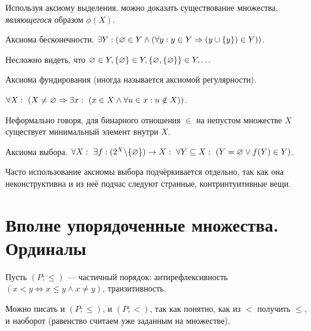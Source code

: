 \documentclass[a4paper]{report}
\begin{document}
{        Используя аксиому выделения, можно доказать существование множества, \textit{являющегося} образом $\phi(X)$.
        \item Аксиома бесконечности. $\exists Y : (\varnothing \in Y \land (\forall y : y \in Y \Rightarrow (y \cup \{y\}) \in Y))$.

        Несложно видеть, что $\varnothing \in Y, \{\varnothing\} \in Y, \{\varnothing, \{\varnothing\}\} \in Y, \dots$
        \item Аксиома фундирования (иногда называется аксиомой регулярности).

        $\forall X:~(X \ne \varnothing \Rightarrow \exists x : ~(x \in X \land \forall u \in x : u \notin X))$.

        Неформально говоря, для бинарного отношения $\in$ на непустом множестве $X$ существует минимальный элемент внутри $X$.

        \begin{samepage}
        \end{samepage}
        \item Аксиома выбора. $\forall X : ~\exists f : (2^X \backslash \{\varnothing\}) \rightarrow X : ~ \forall Y \subseteq X : ~(Y = \varnothing \lor f(Y) \in Y)$.

        Часто использование аксиомы выбора подчёркивается отдельно, так как она неконструктивна и из неё подчас следуют странные, контринтуитивные вещи.
    }



    \section{Вполне упорядоченные множества. Ординалы}
    Пусть $(P; \le)$ --- частичный порядок: антирефлексивность $(x < y \iff x \le y \land x \ne y)$, транзитивность.

    Можно писать и $(P; \le)$, и $(P; <)$, так как понятно, как из $<$ получить $\le$, и наоборот (равенство считаем уже заданным на множестве).
\end{document}
